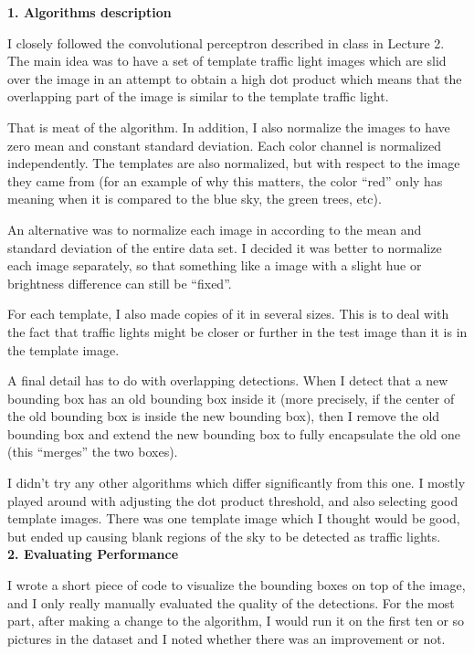 \documentclass[12pt,letterpaper]{article} \usepackage{fullpage}
\begin{document}

\textbf{1. Algorithms description}

I closely followed the convolutional perceptron described in class in Lecture 2.
The main idea was to have a set of template traffic light images which are slid over
the image in an attempt to obtain a high dot product which means that the overlapping
part of the image is similar to the template traffic light.

That is meat of the algorithm. In addition, I also normalize the images to have zero
mean and constant standard deviation. Each color channel is normalized independently.
The templates are also normalized, but with respect to the image they came from (for
an example of why this matters, the color ``red'' only has meaning when it is compared
to the blue sky, the green trees, etc).

An alternative was to normalize each image in according to the mean and standard
deviation of the entire data set. I decided it was better to normalize each image
separately, so that something like a image with a slight hue or brightness difference
can still be ``fixed''.

For each template, I also made copies of it in several sizes. This is to deal with the
fact that traffic lights might be closer or further in the test image than it is in
the template image.

A final detail has to do with overlapping detections. When I detect that a new bounding
box has an old bounding box inside it (more precisely, if the center of the old bounding
box is inside the new bounding box), then I remove the old bounding box and extend the
new bounding box to fully encapsulate the old one (this ``merges'' the two boxes).

I didn't try any other algorithms which differ significantly from this one. I mostly
played around with adjusting the dot product threshold, and also selecting good
template images. There was one template image which I thought would be good, but ended
up causing blank regions of the sky to be detected as traffic lights.\\


\textbf{2. Evaluating Performance}

I wrote a short piece of code to visualize the bounding boxes on top of the image,
and I only really manually evaluated the quality of the detections. For the most part,
after making a change to the algorithm, I would run it on the first ten or so pictures
in the dataset and I noted whether there was an improvement or not.
\end{document}
